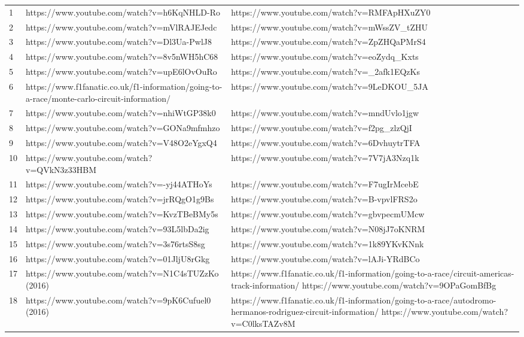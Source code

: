 \documentclass{article}
\begin{document}
\begin{tabularx}{.6\textwidth}{Xll}
1 & https://www.youtube.com/watch?v=h6KqNHLD-Ro & https://www.youtube.com/watch?v=RMFApHXuZY0 \\
2 & https://www.youtube.com/watch?v=mVlRAJEJedc & https://www.youtube.com/watch?v=mWssZV_tZHU \\
3 & https://www.youtube.com/watch?v=Dl3Ua-PwlJ8 & https://www.youtube.com/watch?v=ZpZHQaPMrS4 \\
4 & https://www.youtube.com/watch?v=8v5nWH5hC68 & https://www.youtube.com/watch?v=eoZydq_Kxts \\
5 & https://www.youtube.com/watch?v=upE6lOvOuRo & https://www.youtube.com/watch?v=_2afk1EQzKs \\
6 & https://www.f1fanatic.co.uk/f1-information/going-to-a-race/monte-carlo-circuit-information/ & https://www.youtube.com/watch?v=9LeDKOU_5JA \\
7 & https://www.youtube.com/watch?v=nhiWtGP38k0 & https://www.youtube.com/watch?v=mndUvlo1jgw \\
8 & https://www.youtube.com/watch?v=GONa9mfmhzo & https://www.youtube.com/watch?v=f2pg_zlzQjI \\
9 & https://www.youtube.com/watch?v=V48O2eYgxQ4 & https://www.youtube.com/watch?v=6DvhuytrTFA \\
10 & https://www.youtube.com/watch?v=QVkN3z33HBM & https://www.youtube.com/watch?v=7V7jA3Nzq1k \\
11 & https://www.youtube.com/watch?v=-yj44ATHoYs & https://www.youtube.com/watch?v=F7ugIrMcebE \\
12 & https://www.youtube.com/watch?v=jrRQgO1g9Bs & https://www.youtube.com/watch?v=B-vpvlFRS2o \\
13 & https://www.youtube.com/watch?v=KvzTBeBMy5s & https://www.youtube.com/watch?v=gbvpecmUMcw \\
14 & https://www.youtube.com/watch?v=93L5lbDa2ig & https://www.youtube.com/watch?v=N08jJ7oKNRM \\
15 & https://www.youtube.com/watch?v=3s76rtsS8sg & https://www.youtube.com/watch?v=1k89YKvKNnk \\
16 & https://www.youtube.com/watch?v=01JljU8rGkg & https://www.youtube.com/watch?v=lAJi-YRdBCo \\
17 & https://www.youtube.com/watch?v=N1C4sTUZzKo (2016) & https://www.f1fanatic.co.uk/f1-information/going-to-a-race/circuit-americas-track-information/ https://www.youtube.com/watch?v=9OPaGomBfBg \\
18 & https://www.youtube.com/watch?v=9pK6Cufuel0 (2016) & https://www.f1fanatic.co.uk/f1-information/going-to-a-race/autodromo-hermanos-rodriguez-circuit-information/ https://www.youtube.com/watch?v=C0lksTAZv8M \\

\end{tabularx}
\end{document}
